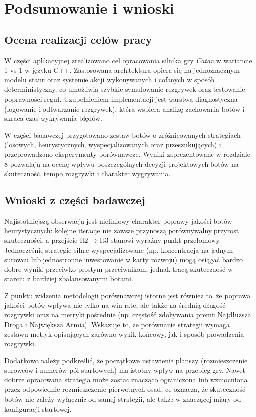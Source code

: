 \documentclass[polish,inz,longabstract]{iithesis}
\begin{document}
\chapter{Podsumowanie i wnioski}
\section{Ocena realizacji celów pracy}
W części aplikacyjnej zrealizowano cel opracowania silnika gry \textit{Catan} w wariancie 1 vs 1 w języku C++. Zastosowana architektura opiera się na jednoznacznym modelu stanu oraz systemie akcji wykonywanych i cofanych w sposób deterministyczny, co umożliwia szybkie symulowanie rozgrywek oraz testowanie poprawności reguł. Uzupełnieniem implementacji jest warstwa diagnostyczna (logowanie i odtwarzanie rozgrywek), która wspiera analizę zachowania botów i skraca czas wykrywania błędów.

W części badawczej przygotowano zestaw botów o zróżnicowanych strategiach (losowych, heurystycznych, wyspecjalizowanych oraz przeszukujących) i przeprowadzono eksperymenty porównawcze. Wyniki zaprezentowane w rozdziale 8 pozwalają na ocenę wpływu poszczególnych decyzji projektowych botów na skuteczność, tempo rozgrywki i charakter wygrywania.

\section{Wnioski z części badawczej}
Najistotniejszą obserwacją jest nieliniowy charakter poprawy jakości botów heurystycznych: kolejne iteracje nie zawsze przynoszą porównywalny przyrost skuteczności, a przejście It2 → It3 stanowi wyraźny punkt przełomowy. Jednocześnie strategie silnie wyspecjalizowane (np. koncentracja na jednym surowcu lub jednostronne inwestowanie w karty rozwoju) mogą osiągać bardzo dobre wyniki przeciwko prostym przeciwnikom, jednak tracą skuteczność w starciu z bardziej zbalansowanymi botami.

Z punktu widzenia metodologii porównawczej istotne jest również to, że poprawa jakości botów wpływa nie tylko na win rate, ale także na średnią długość rozgrywki oraz na metryki pośrednie (np. częstość zdobywania premii Najdłuższa Droga i Największa Armia). Wskazuje to, że porównanie strategii wymaga zestawu metryk opisujących zarówno wynik końcowy, jak i sposób prowadzenia rozgrywki.

Dodatkowo należy podkreślić, że początkowe ustawienie planszy (rozmieszczenie surowców i numerów pól startowych) ma istotny wpływ na przebieg gry. Nawet dobrze opracowana strategia może zostać znacząco ograniczona lub wzmocniona przez odpowiednie rozmieszczenie pierwotnych osad, co oznacza, że skuteczność botów nie zależy wyłącznie od samej strategii, ale także w znaczącej miary od konfiguracji startowej.
\end{document}
